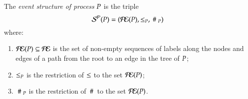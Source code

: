 \begin{definition}  
The {\em event structure of process} $P$ is the triple
\[
 \mathcal{S^P}(P) = (\mathcal{P\!E}(P), \leq_{P} , ~\#~_{P})
 \]
 where:
\begin{enumerate}
\item {} 
   $\mathcal{P\!E}(P) \subseteq \mathcal{P\!E} $ is the set of non-empty sequences
  of labels along the nodes and edges of a path from the root to an
  edge in the tree of $P$; 
\item {} 
$\leq_{P}$ is the restriction of
  $\leq$ to the set %
$\mathcal{P\!E}(P)$;
\item {} 
$~\#~_{P}$ is the restriction of
  $\,\#\,$ to the set 
$\mathcal{P\!E}(P)$.
\end{enumerate}
\end{definition}


